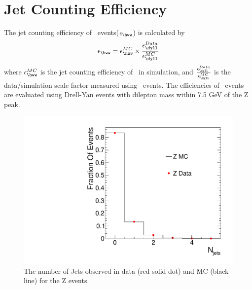 \newpage
\section{Jet Counting Efficiency} 


The jet counting efficiency of \hww~events($\epsilon_{\hww}$) 
is calculated by 
\begin{eqnarray} 
\epsilon_{\hww} 
= \epsilon_{\hww}^{MC} \times \frac{\epsilon_{\dyll}^{Data}}{\epsilon_{\dyll}^{MC}}  
\end{eqnarray} 
where $\epsilon_{\hww}^{MC}$ is the jet counting efficiency of \hww~in simulation, 
and $\frac{\epsilon_{\dyll}^{Data}}{\epsilon_{\dyll}^{MC}}$
is the data/simulation scale factor measured using \dyll~events.
The efficiencies of \dyll~events are evaluated using Drell-Yan events with  
dilepton mass within 7.5 GeV of the Z peak. 
\begin{figure}[!hbtp]
\centering
\includegraphics[width=.7\textwidth]{figures/Znjets.pdf}
\caption{The number of Jets observed in data (red solid dot) and MC (black line) for the Z events. }
\label{fig:znjets}
\end{figure}
